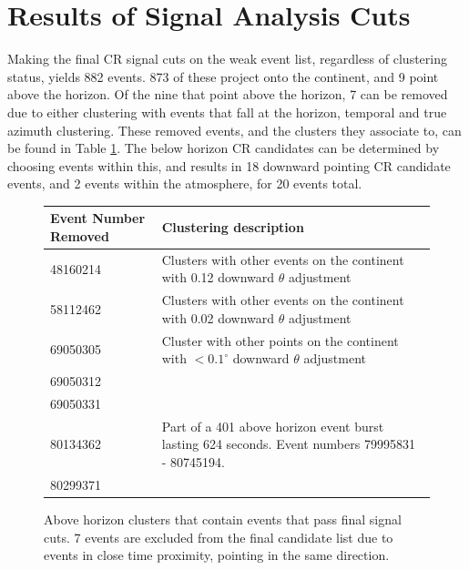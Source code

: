 %		

\section{Results of Signal Analysis Cuts}
		Making the final CR signal cuts on the weak event list, regardless of clustering status, yields 882 events.  873 of these project onto the continent, and 9 point above the horizon.  Of the nine that point above the horizon, 7 can be removed due to either clustering with events that fall at the horizon, temporal and true azimuth clustering.  These removed events, and the clusters they associate to, can be found in Table \ref{tab:aboveHorizonCluster}. The below horizon CR candidates can be determined by choosing events within this, and results in 18 downward pointing CR candidate events, and 2 events within the atmosphere, for 20 events total.  
		
	\begin{figure}
		\centering
		\begin{tabular}[c]{|l|p{7cm}|}
		\hline
		Event Number Removed & Clustering description \\
		\hline
		48160214 &  Clusters with other events on the continent with 0.12 downward $\theta$ adjustment \\
		\hline
		58112462 &  Clusters with other events on the continent with 0.02 downward $\theta$ adjustment \\
		\hline
		69050305 &  Cluster with other points on the continent with  $<0.1^\circ$ downward $\theta$ adjustment \\
		69050312 &  \\
		69050331 &  \\
		\hline
		80134362 &  Part of a 401 above horizon event burst lasting 624 seconds. Event numbers 79995831 - 80745194. \\
		80299371 &  \\
		\hline
		\end{tabular}
		\caption{Above horizon clusters that contain events that pass final signal cuts.  7 events are excluded from the final candidate list due to events in close time proximity, pointing in the same direction.}
		\label{tab:aboveHorizonCluster}
	\end{figure}
	
